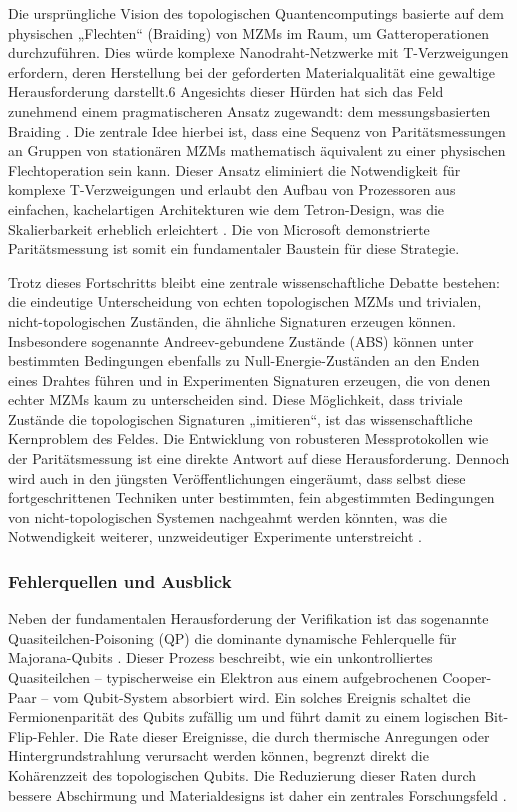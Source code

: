 Die ursprüngliche Vision des topologischen Quantencomputings basierte auf dem physischen „Flechten“ (Braiding) von MZMs im Raum, um Gatteroperationen durchzuführen. Dies würde komplexe Nanodraht-Netzwerke mit T-Verzweigungen erfordern, deren Herstellung bei der geforderten Materialqualität eine gewaltige Herausforderung darstellt.6 Angesichts dieser Hürden hat sich das Feld zunehmend einem pragmatischeren Ansatz zugewandt: dem messungsbasierten Braiding \cite{amorimMajoranaBraidingDynamics2015}. Die zentrale Idee hierbei ist, dass eine Sequenz von Paritätsmessungen an Gruppen von stationären MZMs mathematisch äquivalent zu einer physischen Flechtoperation sein kann. Dieser Ansatz eliminiert die Notwendigkeit für komplexe T-Verzweigungen und erlaubt den Aufbau von Prozessoren aus einfachen, kachelartigen Architekturen wie dem Tetron-Design, was die Skalierbarkeit erheblich erleichtert \cite{bolgarMicrosoftsMajorana1}. Die von Microsoft demonstrierte Paritätsmessung ist somit ein fundamentaler Baustein für diese Strategie.

Trotz dieses Fortschritts bleibt eine zentrale wissenschaftliche Debatte bestehen: die eindeutige Unterscheidung von echten topologischen MZMs und trivialen, nicht-topologischen Zuständen, die ähnliche Signaturen erzeugen können. Insbesondere sogenannte Andreev-gebundene Zustände (ABS) können unter bestimmten Bedingungen ebenfalls zu Null-Energie-Zuständen an den Enden eines Drahtes führen und in Experimenten Signaturen erzeugen, die von denen echter MZMs kaum zu unterscheiden sind. Diese Möglichkeit, dass triviale Zustände die topologischen Signaturen „imitieren“, ist das wissenschaftliche Kernproblem des Feldes. Die Entwicklung von robusteren Messprotokollen wie der Paritätsmessung ist eine direkte Antwort auf diese Herausforderung. Dennoch wird auch in den jüngsten Veröffentlichungen eingeräumt, dass selbst diese fortgeschrittenen Techniken unter bestimmten, fein abgestimmten Bedingungen von nicht-topologischen Systemen nachgeahmt werden könnten, was die Notwendigkeit weiterer, unzweideutiger Experimente unterstreicht \cite{amorimMajoranaBraidingDynamics2015}.

\subsubsection{Fehlerquellen und Ausblick}

Neben der fundamentalen Herausforderung der Verifikation ist das sogenannte Quasiteilchen-Poisoning (QP) die dominante dynamische Fehlerquelle für Majorana-Qubits \cite{svetogorovQuasiparticlePoisoningTrivial2021}. Dieser Prozess beschreibt, wie ein unkontrolliertes Quasiteilchen – typischerweise ein Elektron aus einem aufgebrochenen Cooper-Paar – vom Qubit-System absorbiert wird. Ein solches Ereignis schaltet die Fermionenparität des Qubits zufällig um und führt damit zu einem logischen Bit-Flip-Fehler. Die Rate dieser Ereignisse, die durch thermische Anregungen oder Hintergrundstrahlung verursacht werden können, begrenzt direkt die Kohärenzzeit des topologischen Qubits. Die Reduzierung dieser Raten durch bessere Abschirmung und Materialdesigns ist daher ein zentrales Forschungsfeld \cite{svetogorovQuasiparticlePoisoningTrivial2021}.

